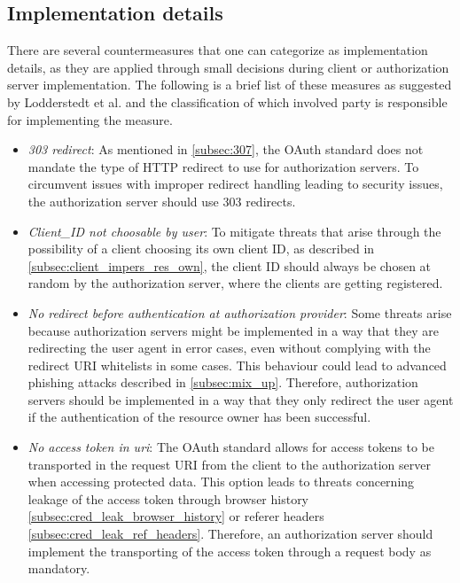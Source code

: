 \documentclass[
    fontsize=12pt,
    headings=small,
    parskip=half,           %
    bibliography=totoc,
    numbers=noenddot,       %
    open=any,               %
    ]{scrreprt}
\begin{document}
\subsection{Implementation details}

There are several countermeasures that one can categorize as implementation details, as they are applied through small decisions during client or authorization server implementation. The following is a brief list of these measures as suggested by Lodderstedt et al. \cite{lodderstedt2020oauth} and the classification of which involved party is responsible for implementing the measure.
\begin{itemize}

\item \emph{303 redirect}: As mentioned in \ref{subsec:307}, the OAuth standard does not mandate the type of HTTP redirect to use for authorization servers. To circumvent issues with improper redirect handling leading to security issues, the authorization server should use 303 redirects.

\item \emph{Client\_ID not choosable by user}: To mitigate threats that arise through the possibility of a client choosing its own client ID, as described in \ref{subsec:client_impers_res_own}, the client ID should always be chosen at random by the authorization server, where the clients are getting registered.

\item \emph{No redirect before authentication at authorization provider}: Some threats arise because authorization servers might be implemented in a way that they are redirecting the user agent in error cases, even without complying with the redirect URI whitelists in some cases. This behaviour could lead to advanced phishing attacks described in \ref{subsec:mix_up}. Therefore, authorization servers should be implemented in a way that they only redirect the user agent if the authentication of the resource owner has been successful.

\item \emph{No access token in uri}: The OAuth standard allows for access tokens to be transported in the request URI from the client to the authorization server when accessing protected data. This option leads to threats concerning leakage of the access token through browser history \ref{subsec:cred_leak_browser_history} or referer headers \ref{subsec:cred_leak_ref_headers}. Therefore, an authorization server should implement the transporting of the access token through a request body as mandatory.


\end{itemize}
\end{document}
